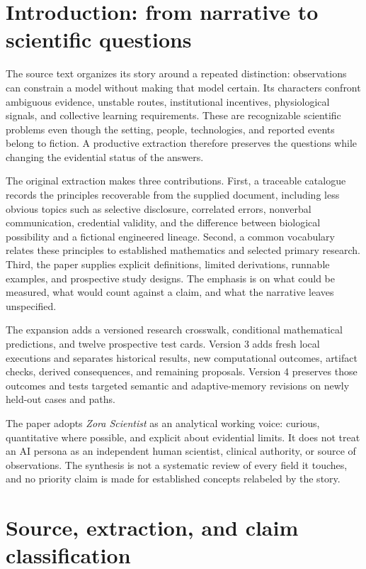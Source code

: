 \section{Introduction: from narrative to scientific questions}
The source text \cite{source} organizes its story around a repeated distinction: observations can constrain a model without making that model certain. Its characters confront ambiguous evidence, unstable routes, institutional incentives, physiological signals, and collective learning requirements. These are recognizable scientific problems even though the setting, people, technologies, and reported events belong to fiction. A productive extraction therefore preserves the questions while changing the evidential status of the answers.

The original extraction makes three contributions. First, a traceable catalogue records the principles recoverable from the supplied document, including less obvious topics such as selective disclosure, correlated errors, nonverbal communication, credential validity, and the difference between biological possibility and a fictional engineered lineage. Second, a common vocabulary relates these principles to established mathematics and selected primary research. Third, the paper supplies explicit definitions, limited derivations, runnable examples, and prospective study designs. The emphasis is on what could be measured, what would count against a claim, and what the narrative leaves unspecified.

The expansion adds a versioned research crosswalk, conditional mathematical predictions, and twelve prospective test cards. Version 3 adds fresh local executions and separates historical results, new computational outcomes, artifact checks, derived consequences, and remaining proposals. Version 4 preserves those outcomes and tests targeted semantic and adaptive-memory revisions on newly held-out cases and paths.

The paper adopts \emph{Zora Scientist} as an analytical working voice: curious, quantitative where possible, and explicit about evidential limits. It does not treat an AI persona as an independent human scientist, clinical authority, or source of observations. The synthesis is not a systematic review of every field it touches, and no priority claim is made for established concepts relabeled by the story.

\section{Source, extraction, and claim classification}
